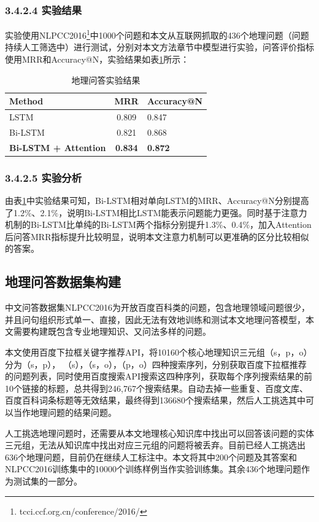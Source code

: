 \subsubsection{3.4.2.4 实验结果}
实验使用NLPCC2016\footnote{tcci.ccf.org.cn/conference/2016/}中1000个问题和本文从互联网抓取的436个地理问题（问题持续人工筛选中）进行测试，分别对本文方法章节中模型进行实验，问答评价指标使用MRR和Accuracy@N，实验结果如表\ref{tab:qa_expriment}所示：
\begin{table}[htbp] 
	\centering
	\caption{\label{tab:qa_expriment}地理问答实验结果} 
	\begin{tabular}{lcl}
		\toprule 
		Method	&      MRR & Accuracy@N \\
		\midrule 
		LSTM & 0.809 & 0.847 \\ 
		Bi-LSTM & 0.821 & 0.868 \\ 
		\textbf{Bi-LSTM + Attention} & \textbf{0.834} & \textbf{0.872} \\ 
		\bottomrule 
	\end{tabular} 
\end{table}

\subsubsection{3.4.2.5 实验分析}
由表\ref{tab:qa_expriment}中实验结果可知，Bi-LSTM相对单向LSTM的MRR、Accuracy@N分别提高了1.2$\%$、2.1$\%$，说明Bi-LSTM相比LSTM能表示问题能力更强。同时基于注意力机制的Bi-LSTM比单纯的Bi-LSTM两个指标分别提升1.3$\%$、0.4$\%$，加入Attention后问答MRR指标提升比较明显，说明本文注意力机制可以更准确的区分比较相似的答案。

\subsection{地理问答数据集构建}
中文问答数据集NLPCC2016为开放百度百科类的问题，包含地理领域问题很少，并且问句组织形式单一、直接，因此无法有效地训练和测试本文地理问答模型，本文需要构建既包含专业地理知识、又问法多样的问题。 

本文使用百度下拉框关键字推荐API，将10160个核心地理知识三元组（s，p，o）分为（s，p），
（s），（s，o），（p，o）四种搜索序列，分别获取百度下拉框推荐的问题列表，同时使用百度搜索API搜索这四种序列，获取每个序列搜索结果的前10个链接的标题，总共得到246,767个搜索结果。自动去掉一些重复、百度文库、百度百科词条标题等无效结果，最终得到136680个搜索结果，然后人工挑选其中可以当作地理问题的结果问题。

人工挑选地理问题时，还需要从本文地理核心知识库中找出可以回答该问题的实体三元组，无法从知识库中找出对应三元组的问题将被丢弃。目前已经人工挑选出636个地理问题，目前仍在继续人工标注中。本文将其中200个问题及其答案和NLPCC2016训练集中的10000个训练样例当作实验训练集。其余436个地理问题作为测试集的一部分。


